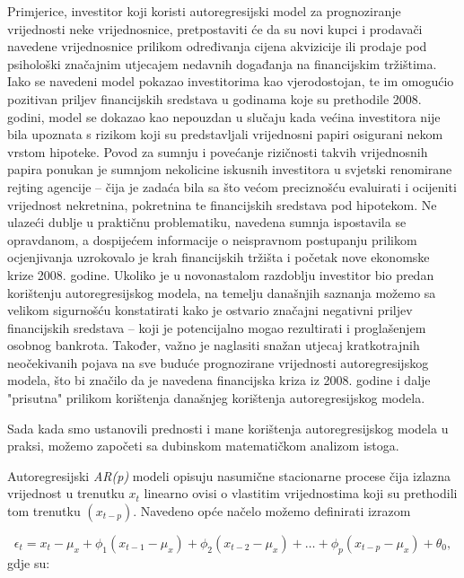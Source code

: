 \documentclass[a4paper,12pt,oneside]{memoir}
\begin{document}
            Primjerice, investitor koji koristi autoregresijski model za prognoziranje vrijednosti neke vrijednosnice, pretpostaviti će da su novi kupci i prodavači navedene vrijednosnice prilikom određivanja cijena akvizicije ili prodaje pod psihološki značajnim utjecajem nedavnih događanja na financijskim tržištima. Iako se navedeni model pokazao investitorima kao vjerodostojan, te im omogućio pozitivan priljev financijskih sredstava u godinama koje su prethodile 2008. godini, model se dokazao kao nepouzdan u slučaju kada većina investitora nije bila upoznata s rizikom koji su predstavljali vrijednosni papiri osigurani nekom vrstom hipoteke. Povod za sumnju i povećanje rizičnosti takvih vrijednosnih papira ponukan je sumnjom nekolicine iskusnih investitora u svjetski renomirane rejting agencije -- čija je zadaća bila sa što većom preciznošću evaluirati i ocijeniti vrijednost nekretnina, pokretnina te financijskih sredstava pod hipotekom. Ne ulazeći dublje u praktičnu problematiku, navedena sumnja ispostavila se opravdanom, a dospijećem informacije o neispravnom postupanju prilikom ocjenjivanja uzrokovalo je krah financijskih tržišta i početak nove ekonomske krize 2008. godine. Ukoliko je u novonastalom razdoblju investitor bio predan korištenju autoregresijskog modela, na temelju današnjih saznanja možemo sa velikom sigurnošću konstatirati kako je ostvario značajni negativni priljev financijskih sredstava -- koji je potencijalno mogao rezultirati i proglašenjem osobnog bankrota. Također, važno je naglasiti snažan utjecaj kratkotrajnih neočekivanih pojava na sve buduće prognozirane vrijednosti autoregresijskog modela, što bi značilo da je navedena financijska kriza iz 2008. godine i dalje "prisutna" prilikom korištenja današnjeg korištenja autoregresijskog modela.

            Sada kada smo ustanovili prednosti i mane korištenja autoregresijskog modela u praksi, možemo započeti sa dubinskom matematičkom analizom istoga.

            Autoregresijski \textit{AR(p)} modeli opisuju nasumične stacionarne procese čija izlazna vrijednost u trenutku $x_t$ linearno ovisi o vlastitim vrijednostima koji su prethodili tom trenutku $(x_{t-p})$. Navedeno opće načelo možemo definirati izrazom

            \begin{equation}
                \epsilon_t=x_t-\mu_x+\phi_1(x_{t-1}-\mu_x)+\phi_2(x_{t-2}-\mu_x)+\ldots+\phi_p(x_{t-p}-\mu_x)+\theta_0,
                \label{eq:51}
            \end{equation}
            gdje su:
\end{document}
